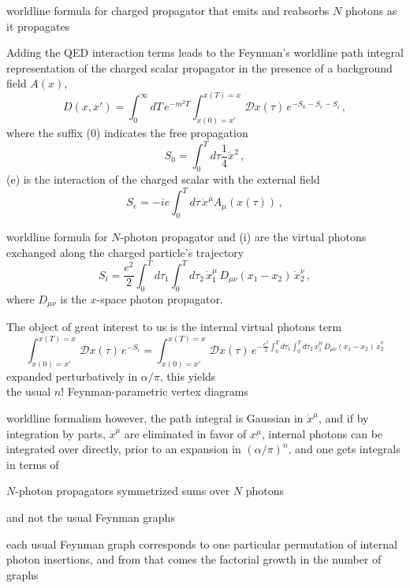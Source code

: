 \begin{frame}{worldline formula for charged propagator}
that emits and reabsorbs $N$ photons as it
propagates%

\medskip

Adding the QED
interaction terms leads to the Feynman's worldline path integral
representation of the charged scalar propagator
in the presence of a background field $A(x)$,
\[ %
D(x,x')=\int_0^\infty\!\!dT\,e^{-m^2T}
    \int_{x(0)=x'}^{x(T)=x}\!\!\mathcal{D}x(\tau)\,
            {e}^{-S_0-S_e-S_i}
\,,
\] %
where the suffix (0) indicates the free propagation
\[ %
S_0 = \int_0^T\!\!d\tau \frac{1}{4}\dot{x}^2
\,,
\] %
(e) is the interaction of the charged scalar with the external field
\[ %
S_e = -ie\int_0^T\!\!d\tau\,\dot{x}^\mu A_\mu(x(\tau))
\,,
\] %
\end{frame}

\begin{frame}{worldline formula for $N$-photon propagator}
and (i) are the virtual photons exchanged along the charged particle's
trajectory
\[ %
S_i = \frac{e^2}{2}\int_0^T\!\!d\tau_1\int_0^T\!\!d\tau_2\,
      \dot{x}_1^\mu\,D_{\mu\nu}(x_1-x_2)\,\dot{x}_2^\nu
\,,
\] %
where $D_{\mu\nu} $ is the $x$-space photon propagator.

\medskip
The object of great interest to us is the internal virtual
photons term
\[ %
\int_{x(0)=x'}^{x(T)=x}\!\!\mathcal{D}x(\tau)\,
            {e}^{-S_i}
=
\int_{x(0)=x'}^{x(T)=x}\!\!\mathcal{D}x(\tau)\,
            {e}^{-\frac{e^2}{2}\int_0^T\!\!d\tau_1\int_0^T\!\!d\tau_2\,
      \dot{x}_1^\mu\,D_{\mu\nu}(x_1-x_2)\,\dot{x}_2^\nu}
\] %
expanded perturbatively in $\alpha/\pi$, this yields \\
the
usual $n!$ Feynman-parametric vertex diagrams
\end{frame}

\begin{frame}{worldline formalism}
however, the path integral is Gaussian in
$\dot{x}^\mu$, and if by integration by parts, $\dot{x}^\mu$ are
eliminated in favor of $x^\mu$, internal photons can be integrated over
directly, prior to an expansion in $(\alpha/\pi)^n$, and one gets
integrals in terms of

\begin{block}{$N$-photon propagators}
symmetrized sums over $N$ photons
\end{block}
and not the usual
Feynman graphs

\bigskip
each usual Feynman graph corresponds to one particular
permutation of internal photon insertions, and from that comes the
factorial growth in the number of graphs
\end{frame}

